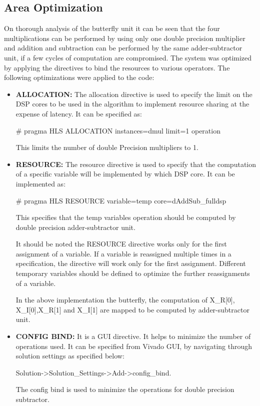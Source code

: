 \subsection{Area Optimization}\label{4.3.1}
On thorough analysis of the butterfly unit it can be seen that the four multiplications can be performed by using only one double precision multiplier and addition and subtraction can be performed by the same adder-subtractor unit, if a few cycles of computation are compromised. The system was optimized by applying the directives to bind the resources to various operators. The following optimizations were applied to the code:
\begin{itemize}
\item
\textbf{ALLOCATION:} The allocation directive is used to specify the limit on the DSP cores to be used in the algorithm to implement resource sharing at the expense of latency. It can be specified as:

\# pragma HLS ALLOCATION instances=dmul limit=1 operation

\noindent This limits the number of double Precision multipliers to 1.
\item
\textbf{RESOURCE:} The resource directive is used to specify that the computation of a specific variable will be implemented by which DSP core. It can be implemented as:

\# pragma HLS RESOURCE variable=temp core=dAddSub\_fulldsp

\noindent This specifies that the temp variables operation should be computed by double precision adder-subtractor unit.

\noindent It should be noted the RESOURCE directive works only for the first assignment of a variable. If a variable is reassigned multiple times in a specification, the directive will work only for the first assignment. Different temporary variables should be defined to optimize the further reassignments of a variable.

In the above implementation the butterfly, the computation of X\_R[0], X\_I[0],X\_R[1] and X\_I[1] are mapped to be computed by adder-subtractor unit.
\item
\textbf{CONFIG BIND:} It is a GUI directive. It helps to minimize the number of operations used. It can be specified from Vivado GUI, by navigating through solution settings as specified below:

Solution-\textgreater Solution\_Settings-\textgreater Add-\textgreater config\_bind.


The config bind is used to minimize the operations for double precision subtractor.
\end{itemize}
